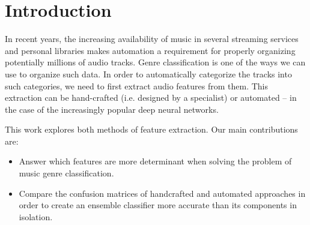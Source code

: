 \section{Introduction}

In recent years, the increasing availability of music in several streaming services and personal libraries makes automation a requirement for properly organizing potentially millions of audio tracks. Genre classification is one of the ways we can use to organize such data. In order to automatically categorize the tracks into such categories, we need to first extract audio features from them. This extraction can be hand-crafted (i.e. designed by a specialist) or automated -- in the case of the increasingly popular deep neural networks.



This work explores both methods of feature extraction. Our main contributions are:

\begin{itemize}
    \item Answer which features are more determinant when solving the problem of music genre classification.
    \item Compare the confusion matrices of handcrafted and automated approaches in order to create an ensemble classifier more accurate than its components in isolation.
\end{itemize}

